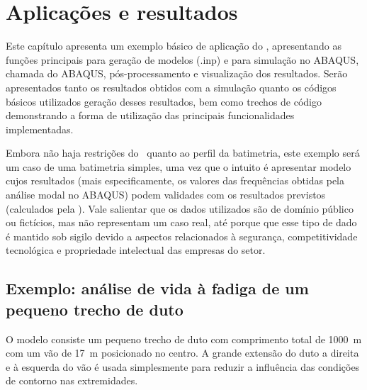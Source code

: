 
\chapter{Aplicações e resultados\label{chap:aplicacoes}}

Este capítulo apresenta um exemplo básico de aplicação do \frame, apresentando as funções principais para geração de modelos (.inp) e para simulação no ABAQUS, chamada do ABAQUS, pós-processamento e visualização dos resultados. Serão apresentados tanto os resultados obtidos com a simulação quanto os códigos básicos utilizados geração desses resultados, bem como trechos de código demonstrando a forma de utilização das principais funcionalidades implementadas.

Embora não haja restrições do \frame\ quanto ao perfil da batimetria, este exemplo será um caso de uma batimetria simples, uma vez que o intuito é apresentar modelo cujos resultados (mais especificamente, os valores das frequências obtidas pela análise modal no ABAQUS) podem validades com os resultados previstos (calculados pela \fatfree).
Vale salientar que os dados utilizados são de domínio público ou fictícios, mas não representam um caso real, até porque que esse tipo de dado é mantido sob sigilo devido a aspectos relacionados à segurança, competitividade tecnológica e propriedade intelectual das empresas do setor.


\section{Exemplo: análise de vida à fadiga de um pequeno trecho de duto\label{sec:model-exemplo}}


O modelo consiste um pequeno trecho de duto com comprimento total de 1000~m com um vão de 17~m posicionado no centro. A grande extensão do duto a direita e à esquerda do vão é usada simplesmente para reduzir a influência das condições de contorno nas extremidades.

